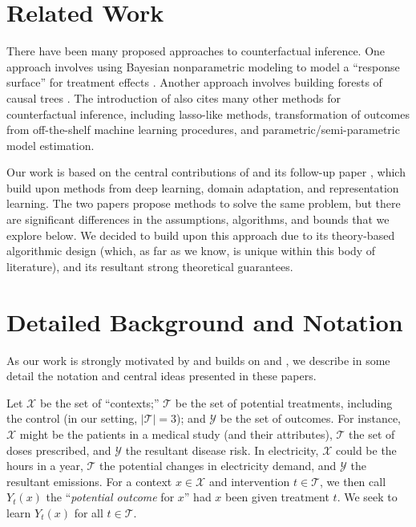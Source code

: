 \documentclass{article}
\begin{document}
\section{Related Work}
There have been many proposed approaches to counterfactual inference.
One approach involves using Bayesian nonparametric modeling to model a ``response surface'' for treatment effects \cite{hill2011bayesian, green2012modeling}.
Another approach involves building forests of causal trees \cite{athey2016recursive, wager2017estimation}.
The introduction of \cite{wager2017estimation} also cites many other methods for counterfactual inference, including lasso-like methods, transformation of outcomes from off-the-shelf machine learning procedures, and parametric/semi-parametric model estimation. 

Our work is based on the central contributions of \cite{johansson2016learning} and its follow-up paper \cite{shalit2017estimating}, which build upon methods from deep learning, domain adaptation, and representation learning. 
The two papers propose methods to solve the same problem, but there are significant differences in the assumptions, algorithms, and bounds that we explore below. 
We decided to build upon this approach due to its theory-based algorithmic design (which, as far as we know, is unique within this body of literature), and its resultant strong theoretical guarantees.

\section{Detailed Background and Notation}


As our work is strongly motivated by and builds on \cite{johansson2016learning} and \cite{shalit2017estimating}, we describe in some detail the notation and central ideas presented in these papers.

Let $\mathcal{X}$ be the set of ``contexts;'' $\mathcal{T}$ be the set of potential treatments, including the control (in our setting, $|\mathcal{T}| = 3$); and $\mathcal{Y}$ be the set of outcomes.
For instance, $\mathcal{X}$ might be the patients in a medical study (and their attributes), $\mathcal{T}$ the set of doses prescribed, and $\mathcal{Y}$ the resultant disease risk.
In electricity, $\mathcal{X}$ could be the hours in a year, $\mathcal{T}$ the potential changes in electricity demand, and $\mathcal{Y}$ the resultant emissions. 
For a context $x \in \mathcal{X}$ and intervention $t \in \mathcal{T}$, we then call $Y_t(x)$ the ``\emph{potential outcome} for $x$'' \cite{johansson2016learning} had $x$ been given treatment $t$.
We seek to learn $Y_t(x)$ for all $t \in \mathcal{T}.$
\end{document}
